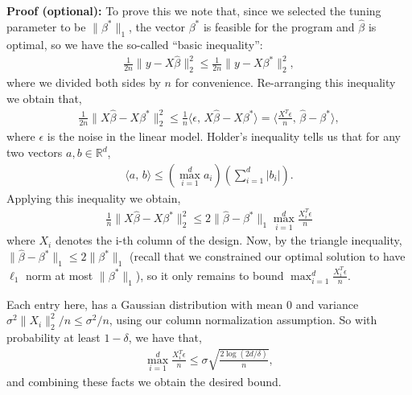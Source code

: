\documentclass[twoside,12pt]{article}
\newcommand{\inprod}[2]{\ensuremath{\langle #1 , \, #2 \rangle}}
\begin{document}
{\bf Proof (optional): } To prove this we note that, since we selected the tuning parameter to be $\|\beta^*\|_1$, the vector $\beta^*$ is feasible for the program and $\widehat{\beta}$ is optimal, so we have the so-called ``basic inequality'':
\begin{align*}
\frac{1}{2n} \|y - X\widehat{\beta}\|_2^2 \leq \frac{1}{2n} \|y - X\beta^*\|_2^2,
\end{align*}
where we divided both sides by $n$ for convenience. Re-arranging this inequality we obtain that,
\begin{align*}
\frac{1}{2n} \|X\widehat{\beta} - X \beta^*\|_2^2 \leq \frac{1}{n} \inprod{\epsilon}{X\widehat{\beta} - X \beta^*} =  \inprod{\frac{X^{T} \epsilon}{n}}{\widehat{\beta} - \beta^*},
\end{align*}
where $\epsilon$ is the noise in the linear model. Holder's inequality tells us that for any two vectors $a,b \in \mathbb{R}^d$, 
\begin{align*}
\inprod{a}{b} \leq \left(\max_{i=1}^d a_i\right) \left( \sum_{i=1}^d |b_i| \right).
\end{align*}
Applying this inequality we obtain,
\begin{align*}
\frac{1}{n} \|X\widehat{\beta} - X \beta^*\|_2^2 \leq 2 \|\widehat{\beta} - \beta^*\|_1 \max_{i=1}^d \frac{X_i ^{T} \epsilon}{n}
\end{align*}
where $X_i$ denotes the i-th column of the design. Now, by the triangle inequality, $ \|\widehat{\beta} - \beta^*\|_1 \leq 2 \|\beta^*\|_1$ (recall that we constrained our optimal solution to have $\ell_1$ norm at most $\|\beta^*\|_1$), so it only remains to bound $\max_{i=1}^d \frac{X_i ^{T} \epsilon}{n}$.

Each entry here, has a Gaussian distribution with mean $0$ and variance $\sigma^2 \|X_i\|_2^2/n \leq \sigma^2/n$, using our column normalization assumption. So with probability at least $1 - \delta$, we have that,
\begin{align*}
\max_{i=1}^d \frac{X_i ^{T} \epsilon}{n} \leq \sigma \sqrt{ \frac{2 \log(2d/\delta)}{n}},
\end{align*}
and combining these facts we obtain the desired bound.
\end{document}

